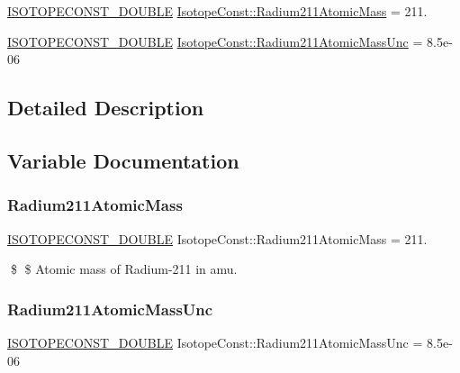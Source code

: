 \begin{DoxyCompactItemize}
\item 
\mbox{\hyperlink{group___isotope_const-_macros_ga8f45a7272ce02c0b4c65c44636ed719a}{I\+S\+O\+T\+O\+P\+E\+C\+O\+N\+S\+T\+\_\+\+D\+O\+U\+B\+LE}} \mbox{\hyperlink{group___isotope_const-_radium-_ra211_ga0a88a509a9f84cf5782006705584cb3e}{Isotope\+Const\+::\+Radium211\+Atomic\+Mass}} = 211.
\item 
\mbox{\hyperlink{group___isotope_const-_macros_ga8f45a7272ce02c0b4c65c44636ed719a}{I\+S\+O\+T\+O\+P\+E\+C\+O\+N\+S\+T\+\_\+\+D\+O\+U\+B\+LE}} \mbox{\hyperlink{group___isotope_const-_radium-_ra211_ga77b909cbefe003688e34144c7790e81b}{Isotope\+Const\+::\+Radium211\+Atomic\+Mass\+Unc}} = 8.\+5e-\/06
\end{DoxyCompactItemize}


\subsection{Detailed Description}


\subsection{Variable Documentation}
\mbox{\label{group___isotope_const-_radium-_ra211_ga0a88a509a9f84cf5782006705584cb3e}} 
\subsubsection{\texorpdfstring{Radium211\+Atomic\+Mass}{Radium211AtomicMass}}
{\footnotesize\ttfamily \mbox{\hyperlink{group___isotope_const-_macros_ga8f45a7272ce02c0b4c65c44636ed719a}{I\+S\+O\+T\+O\+P\+E\+C\+O\+N\+S\+T\+\_\+\+D\+O\+U\+B\+LE}} Isotope\+Const\+::\+Radium211\+Atomic\+Mass = 211.}

\$ \$ Atomic mass of Radium-\/211 in amu. \mbox{\label{group___isotope_const-_radium-_ra211_ga77b909cbefe003688e34144c7790e81b}} 
\subsubsection{\texorpdfstring{Radium211\+Atomic\+Mass\+Unc}{Radium211AtomicMassUnc}}
{\footnotesize\ttfamily \mbox{\hyperlink{group___isotope_const-_macros_ga8f45a7272ce02c0b4c65c44636ed719a}{I\+S\+O\+T\+O\+P\+E\+C\+O\+N\+S\+T\+\_\+\+D\+O\+U\+B\+LE}} Isotope\+Const\+::\+Radium211\+Atomic\+Mass\+Unc = 8.\+5e-\/06}

